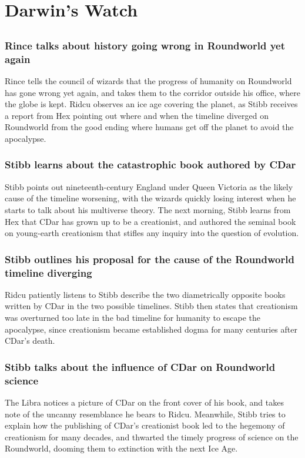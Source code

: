\section{Darwin's Watch}


\subsection{}
\subsubsection{\Gls{Rince} talks about history going wrong in Roundworld yet again}
\Gls{Rince} tells the council of wizards that the progress of humanity on Roundworld has gone wrong
yet again, and takes them to the corridor outside his office, where the globe is kept. \Gls{Ridcu}
observes an ice age covering the planet, as \Gls{Stibb} receives a report from \Gls{Hex} pointing
out where and when the timeline diverged on Roundworld from the good ending where humans get off
the planet to avoid the apocalypse.

\subsubsection{\Gls{Stibb} learns about the catastrophic book authored by \Gls{CDar}}
\Gls{Stibb} points out nineteenth-century England under Queen Victoria as the likely cause of the
timeline worsening, with the wizards quickly losing interest when he starts to talk about his
multiverse theory. The next morning, \Gls{Stibb} learns from \Gls{Hex} that \Gls{CDar} has grown up
to be a creationist, and authored the seminal book on young-earth creationism that stifles any
inquiry into the question of evolution.

\subsubsection{\Gls{Stibb} outlines his proposal for the cause of the Roundworld timeline
    diverging}
\Gls{Ridcu} patiently listens to \Gls{Stibb} describe the two diametrically opposite books written
by \Gls{CDar} in the two possible timelines. \Gls{Stibb} then states that creationism was overturned
too late in the bad timeline for humanity to escape the apocalypse, since creationism became
established dogma for many centuries after \Gls{CDar}'s death.

\subsubsection{\Gls{Stibb} talks about the influence of \Gls{CDar} on Roundworld science}
The \Gls{Libra} notices a picture of \Gls{CDar} on the front cover of his book, and takes note of
the uncanny resemblance he bears to \Gls{Ridcu}. Meanwhile, \Gls{Stibb} tries to explain how the
publishing of \Gls{CDar}'s creationist book led to the hegemony of creationism for many decades,
and thwarted the timely progress of science on the Roundworld, dooming them to extinction with the
next Ice Age.

